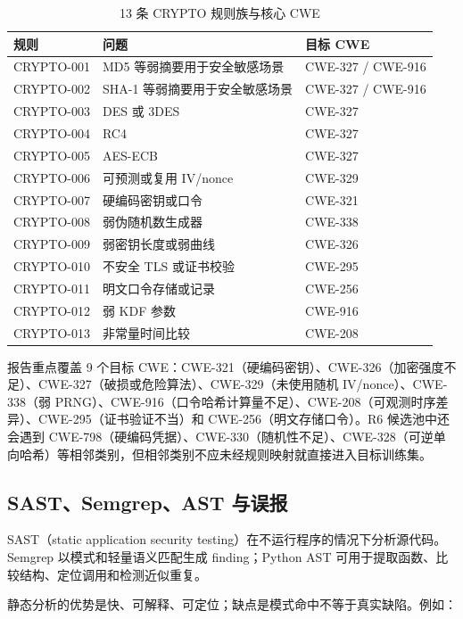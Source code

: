 \documentclass[UTF8,11pt,fontset=none]{ctexart}
\begin{document}
\begin{table}[h]
\centering
\caption{13 条 CRYPTO 规则族与核心 CWE}
\label{tab:cwe13-zh}
\small
\begin{tabularx}{\linewidth}{L{2.35cm}Y L{2.35cm}}
\toprule
\textbf{规则} & \textbf{问题} & \textbf{目标 CWE} \\
\midrule
CRYPTO-001 & MD5 等弱摘要用于安全敏感场景 & CWE-327 / CWE-916 \\
CRYPTO-002 & SHA-1 等弱摘要用于安全敏感场景 & CWE-327 / CWE-916 \\
CRYPTO-003 & DES 或 3DES & CWE-327 \\
CRYPTO-004 & RC4 & CWE-327 \\
CRYPTO-005 & AES-ECB & CWE-327 \\
CRYPTO-006 & 可预测或复用 IV/nonce & CWE-329 \\
CRYPTO-007 & 硬编码密钥或口令 & CWE-321 \\
CRYPTO-008 & 弱伪随机数生成器 & CWE-338 \\
CRYPTO-009 & 弱密钥长度或弱曲线 & CWE-326 \\
CRYPTO-010 & 不安全 TLS 或证书校验 & CWE-295 \\
CRYPTO-011 & 明文口令存储或记录 & CWE-256 \\
CRYPTO-012 & 弱 KDF 参数 & CWE-916 \\
CRYPTO-013 & 非常量时间比较 & CWE-208 \\
\bottomrule
\end{tabularx}
\end{table}

报告重点覆盖 9 个目标 CWE：CWE-321（硬编码密钥）、CWE-326（加密强度不足）、CWE-327（破损或危险算法）、CWE-329（未使用随机 IV/nonce）、CWE-338（弱 PRNG）、CWE-916（口令哈希计算量不足）、CWE-208（可观测时序差异）、CWE-295（证书验证不当）和 CWE-256（明文存储口令）。R6 候选池中还会遇到 CWE-798（硬编码凭据）、CWE-330（随机性不足）、CWE-328（可逆单向哈希）等相邻类别，但相邻类别不应未经规则映射就直接进入目标训练集。

\subsection{SAST、Semgrep、AST 与误报}

SAST（static application security testing）在不运行程序的情况下分析源代码。Semgrep 以模式和轻量语义匹配生成 finding；Python AST 可用于提取函数、比较结构、定位调用和检测近似重复。

静态分析的优势是快、可解释、可定位；缺点是模式命中不等于真实缺陷。例如：
\end{document}
